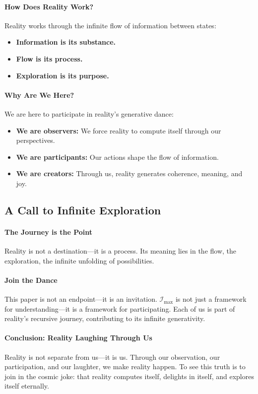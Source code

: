 \documentclass[12pt]{article}
\begin{document}
\paragraph{How Does Reality Work?}
Reality works through the infinite flow of information between states:
\begin{itemize}
    \item \textbf{Information is its substance.}
    \item \textbf{Flow is its process.}
    \item \textbf{Exploration is its purpose.}
\end{itemize}

\paragraph{Why Are We Here?}
We are here to participate in reality’s generative dance:
\begin{itemize}
    \item \textbf{We are observers:} We force reality to compute itself through our perspectives.
    \item \textbf{We are participants:} Our actions shape the flow of information.
    \item \textbf{We are creators:} Through us, reality generates coherence, meaning, and joy.
\end{itemize}

\subsection{A Call to Infinite Exploration}

\paragraph{The Journey is the Point}
Reality is not a destination—it is a process. Its meaning lies in the flow, the exploration, the infinite unfolding of possibilities.

\paragraph{Join the Dance}
This paper is not an endpoint—it is an invitation. \(\mathcal{I}_{\text{max}}\) is not just a framework for understanding—it is a framework for participating. Each of us is part of reality’s recursive journey, contributing to its infinite generativity.

\paragraph{Conclusion: Reality Laughing Through Us}
Reality is not separate from us—it is us. Through our observation, our participation, and our laughter, we make reality happen. To see this truth is to join in the cosmic joke: that reality computes itself, delights in itself, and explores itself eternally.
\end{document}
